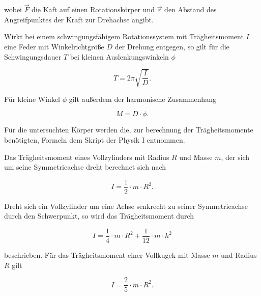 \noindent wobei $\vec{F}$ die Kaft auf einen
Rotationskörper und $\vec{r}$ den Abstand des 
Angreifpunktes der Kraft zur Drehachse angibt.

Wirkt bei einem schwingungsfähigem Rotationssystem
mit Trägheitsmoment $I$
eine Feder mit Winkelrichtgröße $D$ der Drehung entgegen,
so gilt für die Schwingungsdauer $T$ bei kleinen 
Auslenkungswinkeln $\phi$

\begin{equation}
    T=2\pi \sqrt{\frac{I}{D}}.
\end{equation}

\noindent Für kleine Winkel $\phi$ gilt außerdem der
harmonische Zusammenhang

\begin{equation}
    M=D \cdot \phi.
\end{equation}

\noindent Für die untersuchten Körper werden 
die, zur berechnung der Trägheitsmomente benötigten,
Formeln dem Skript der Physik I \cite{Skript} entnommen.

Das Trägheitsmoment eines Vollzylinders mit Radius $R$
und Masse $m$, der sich um seine
Symmetrieachse dreht berechnet sich nach

\begin{equation}
    I=\frac{1}{2} \cdot m \cdot R^2.
    \label{eq:zyl1}
\end{equation}

\noindent Dreht sich ein Vollzylinder um eine Achse senkrecht
zu seiner Symmetrieachse durch den Schwerpunkt, so wird das Trägheitsmoment durch

\begin{equation}
    I=\frac{1}{4} \cdot m \cdot R^2 + \frac{1}{12} \cdot m \cdot h^2
    \label{eq:zyl2}
\end{equation}

\noindent beschrieben. Für das Trägheitsmoment einer
Vollkugek  mit Masse $m$ und Radius $R$ gilt

\begin{equation}
    I=\frac{2}{5} \cdot m \cdot R^2.
    \label{eq:Kugel}
\end{equation}